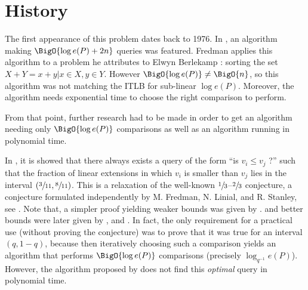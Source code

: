 

\section{History}


The first appearance of this problem dates back to 1976. In \cite{fredman1976good}, an algorithm making $\BigO{\log e(P) + 2n}$ queries was featured. Fredman applies this algorithm to a problem he attributes to Elwyn Berlekamp : sorting the set $X + Y = {x + y | x \in X, y \in Y}$. However $\BigO{\log e(P)} \neq \BigO{n}$, so this algorithm was not matching the ITLB for sub-linear $\log e(P)$. Moreover, the algorithm needs exponential time to choose the right comparison to perform.


From that point, further research had to be made in order to get an algorithm needing only $\BigO{\log e(P)}$ comparisons as well as an algorithm running in polynomial time.


In \cite{kahn1984balancing}, it is showed that there always exists a query of the form ``is $v_i \leq v_j$ ?'' such that the fraction of linear extensions in which $v_i$ is smaller than $v_j$ lies in the interval $(\sfrac{3}{11}, \sfrac{8}{11})$. This is a relaxation of the well-known $\sfrac{1}{3}$--$\sfrac{2}{3}$ conjecture, a conjecture formulated independently by M. Fredman, N. Linial, and R. Stanley, see \cite{linial1984information}. Note that, a simpler proof yielding weaker bounds was given by \cite{kahn1991balancing}. and better bounds were later given by \cite{brightwell1995balancing}, and \cite{brightwell1999balanced}. In fact, the only requirement for a practical use (without proving the conjecture) was to prove that it was true for an interval $(q, 1-q)$, because then iteratively choosing such a comparison yields an algorithm that performs $\BigO{\log e(P)}$ comparisons (precisely $\log_{q^{-1}} e(P)$). However, the algorithm proposed by \cite{kahn1984balancing} does not find this \emph{optimal} query in polynomial time.


